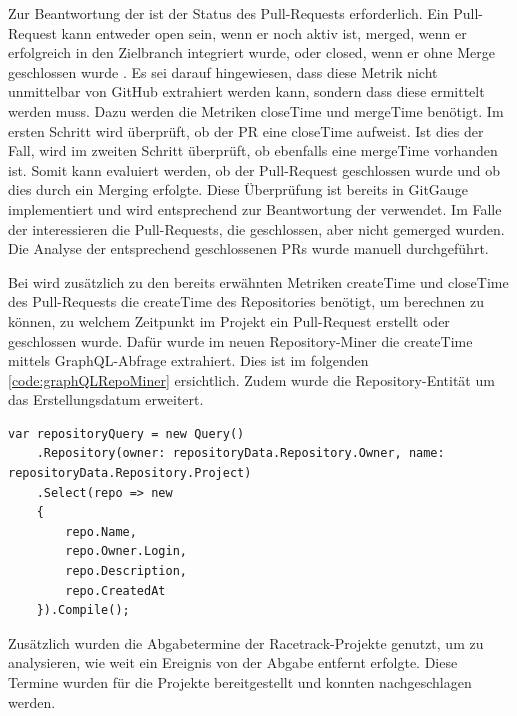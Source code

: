 Zur Beantwortung der  ist der Status des Pull-Requests erforderlich. Ein Pull-Request kann entweder open sein, wenn er noch aktiv ist, merged, wenn er erfolgreich in den Zielbranch integriert wurde, oder closed, wenn er ohne Merge geschlossen wurde \parencite{noauthor_enums_nodate}. Es sei darauf hingewiesen, dass diese Metrik nicht unmittelbar von GitHub extrahiert werden kann, sondern dass diese ermittelt werden muss. Dazu werden die Metriken closeTime und mergeTime benötigt. Im ersten Schritt wird überprüft, ob der PR  eine closeTime aufweist. Ist dies der Fall, wird im zweiten Schritt überprüft, ob ebenfalls eine mergeTime vorhanden ist. Somit kann evaluiert werden, ob der Pull-Request geschlossen wurde und ob dies durch ein Merging erfolgte. Diese Überprüfung ist bereits in GitGauge implementiert und wird entsprechend zur Beantwortung der  verwendet. Im Falle der  interessieren die Pull-Requests, die geschlossen, aber nicht gemerged wurden. Die Analyse der entsprechend geschlossenen PRs wurde manuell durchgeführt.

Bei  wird zusätzlich zu den bereits erwähnten Metriken createTime und closeTime des Pull-Requests die createTime des Repositories benötigt, um berechnen zu können, zu welchem Zeitpunkt im Projekt ein Pull-Request erstellt oder geschlossen wurde.  Dafür wurde im neuen Repository-Miner die createTime mittels GraphQL-Abfrage extrahiert. Dies ist im folgenden \autoref{code:graphQLRepoMiner} ersichtlich. Zudem wurde die Repository-Entität um das Erstellungsdatum erweitert. 
\begin{lstlisting}[language=CSharp, caption={GraphQL-Abfrage Repository}, label={code:graphQLRepoMiner}]
var repositoryQuery = new Query()
    .Repository(owner: repositoryData.Repository.Owner, name: repositoryData.Repository.Project)
    .Select(repo => new
    {
        repo.Name,
        repo.Owner.Login,
        repo.Description,
        repo.CreatedAt
    }).Compile();
\end{lstlisting}

Zusätzlich wurden die Abgabetermine der Racetrack-Projekte genutzt, um zu analysieren, wie weit ein Ereignis von der Abgabe entfernt erfolgte. Diese Termine wurden für die Projekte bereitgestellt und konnten nachgeschlagen werden.

